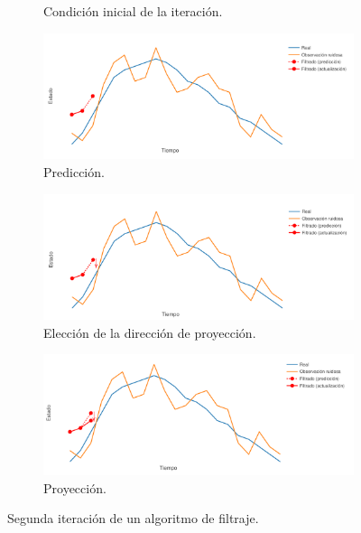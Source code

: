 \begin{itemize}
\begin{figure}[h!]
\begin{subfigure}[b]{.49\linewidth}
            \caption{Condición inicial de la iteración.}
        \end{subfigure}
        \begin{subfigure}[b]{.49\linewidth}
        \centering
            \includegraphics[width=\linewidth]{img/content/chapter2/filt5.pdf}
            \caption{Predicción.}
        \end{subfigure}
        \begin{subfigure}[b]{.49\linewidth}
        \centering
            \includegraphics[width=\linewidth]{img/content/chapter2/filt6.pdf}
            \caption{Elección de la dirección de proyección.}
        \end{subfigure}
        \begin{subfigure}[b]{.49\linewidth}
        \centering
            \includegraphics[width=\linewidth]{img/content/chapter2/filt7.pdf}
            \caption{Proyección.}
        \end{subfigure}
        \caption{Segunda iteración de un algoritmo de filtraje.}

\end{figure}
\end{itemize}

